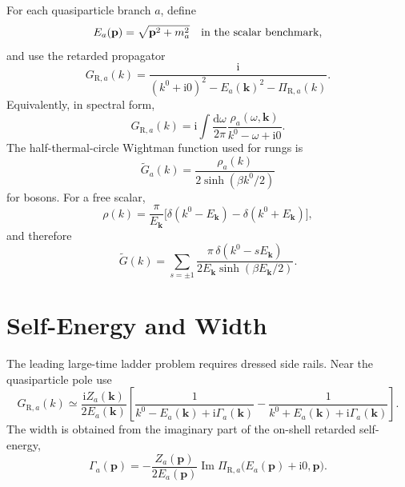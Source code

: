 \documentclass[11pt]{article}
\newcommand{\dd}{\mathrm{d}}
\newcommand{\ii}{\mathrm{i}}
\newcommand{\R}{\mathrm{R}}
\begin{document}
For each quasiparticle branch \(a\), define
\begin{equation}
  E_a(\mathbf p) = \sqrt{\mathbf p^2 + m_a^2}
  \quad\hbox{in the scalar benchmark,}
\end{equation}
and use the retarded propagator
\begin{equation}
  G_{\R,a}(k)
  =
  \frac{\ii}{(k^0+\ii0)^2-E_a(\mathbf k)^2-\Pi_{\R,a}(k)} .
  \label{eq:retarded-general}
\end{equation}
Equivalently, in spectral form,
\begin{equation}
  G_{\R,a}(k)
  =
  \ii\int\frac{\dd\omega}{2\pi}
  \frac{\rho_a(\omega,\mathbf k)}{k^0-\omega+\ii0}.
  \label{eq:spectral-retarded}
\end{equation}
The half-thermal-circle Wightman function used for rungs is
\begin{equation}
  \widetilde G_a(k)
  =
  \frac{\rho_a(k)}{2\sinh(\beta k^0/2)}
  \label{eq:half-wightman}
\end{equation}
for bosons. For a free scalar,
\begin{equation}
  \rho(k)
  =
  \frac{\pi}{E_{\mathbf k}}
  \bigl[
    \delta(k^0-E_{\mathbf k})-\delta(k^0+E_{\mathbf k})
  \bigr],
\end{equation}
and therefore
\begin{equation}
  \widetilde G(k)
  =
  \sum_{s=\pm 1}
  \frac{\pi\,\delta(k^0-sE_{\mathbf k})}
       {2E_{\mathbf k}\sinh(\beta E_{\mathbf k}/2)}.
  \label{eq:free-wightman}
\end{equation}

\section{Self-Energy and Width}

The leading large-time ladder problem requires dressed side rails. Near the
quasiparticle pole use
\begin{equation}
  G_{\R,a}(k)
  \simeq
  \frac{\ii Z_a(\mathbf k)}{2E_a(\mathbf k)}
  \left[
    \frac{1}{k^0-E_a(\mathbf k)+\ii\Gamma_a(\mathbf k)}
    -
    \frac{1}{k^0+E_a(\mathbf k)+\ii\Gamma_a(\mathbf k)}
  \right].
  \label{eq:dressed-retarded}
\end{equation}
The width is obtained from the imaginary part of the on-shell retarded
self-energy,
\begin{equation}
  \Gamma_a(\mathbf p)
  =
  -\frac{Z_a(\mathbf p)}
         {2E_a(\mathbf p)}
  \operatorname{Im}
  \Pi_{\R,a}\bigl(E_a(\mathbf p)+\ii0,\mathbf p\bigr).
  \label{eq:width}
\end{equation}
\end{document}
